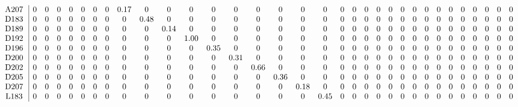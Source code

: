 \begin{table}[H]
\begin{center}
\begin{math}
\begin{array}{c|cccccccccccccccccccccccccccccccc}
\mathrm{A207} \hspace*{2pt} &  0 &  0 &  0 &  0 &  0 &  0 &  0 &       0.17 &  0 &  0 &  0 &  0 &  0 &  0 &  0 &  0 &  0 &  0 &  0 &  0 &  0 &  0 &  0 &  0 &  0 &  0 &  0 &  0 &  0 &  0 &  0 &  0 \\
\mathrm{D183} \hspace*{2pt} &  0 &  0 &  0 &  0 &  0 &  0 &  0 &  0 &       0.48 &  0 &  0 &  0 &  0 &  0 &  0 &  0 &  0 &  0 &  0 &  0 &  0 &  0 &  0 &  0 &  0 &  0 &  0 &  0 &  0 &  0 &  0 &  0 \\
\mathrm{D189} \hspace*{2pt} &  0 &  0 &  0 &  0 &  0 &  0 &  0 &  0 &  0 &       0.14 &  0 &  0 &  0 &  0 &  0 &  0 &  0 &  0 &  0 &  0 &  0 &  0 &  0 &  0 &  0 &  0 &  0 &  0 &  0 &  0 &  0 &  0 \\
\mathrm{D192} \hspace*{2pt} &  0 &  0 &  0 &  0 &  0 &  0 &  0 &  0 &  0 &  0 &       1.00 &  0 &  0 &  0 &  0 &  0 &  0 &  0 &  0 &  0 &  0 &  0 &  0 &  0 &  0 &  0 &  0 &  0 &  0 &  0 &  0 &  0 \\
\mathrm{D196} \hspace*{2pt} &  0 &  0 &  0 &  0 &  0 &  0 &  0 &  0 &  0 &  0 &  0 &       0.35 &  0 &  0 &  0 &  0 &  0 &  0 &  0 &  0 &  0 &  0 &  0 &  0 &  0 &  0 &  0 &  0 &  0 &  0 &  0 &  0 \\
\mathrm{D200} \hspace*{2pt} &  0 &  0 &  0 &  0 &  0 &  0 &  0 &  0 &  0 &  0 &  0 &  0 &       0.31 &  0 &  0 &  0 &  0 &  0 &  0 &  0 &  0 &  0 &  0 &  0 &  0 &  0 &  0 &  0 &  0 &  0 &  0 &  0 \\
\mathrm{D202} \hspace*{2pt} &  0 &  0 &  0 &  0 &  0 &  0 &  0 &  0 &  0 &  0 &  0 &  0 &  0 &       0.66 &  0 &  0 &  0 &  0 &  0 &  0 &  0 &  0 &  0 &  0 &  0 &  0 &  0 &  0 &  0 &  0 &  0 &  0 \\
\mathrm{D205} \hspace*{2pt} &  0 &  0 &  0 &  0 &  0 &  0 &  0 &  0 &  0 &  0 &  0 &  0 &  0 &  0 &       0.36 &  0 &  0 &  0 &  0 &  0 &  0 &  0 &  0 &  0 &  0 &  0 &  0 &  0 &  0 &  0 &  0 &  0 \\
\mathrm{D207} \hspace*{2pt} &  0 &  0 &  0 &  0 &  0 &  0 &  0 &  0 &  0 &  0 &  0 &  0 &  0 &  0 &  0 &       0.18 &  0 &  0 &  0 &  0 &  0 &  0 &  0 &  0 &  0 &  0 &  0 &  0 &  0 &  0 &  0 &  0 \\
\mathrm{L183} \hspace*{2pt} &  0 &  0 &  0 &  0 &  0 &  0 &  0 &  0 &  0 &  0 &  0 &  0 &  0 &  0 &  0 &  0 &       0.45 &  0 &  0 &  0 &  0 &  0 &  0 &  0 &  0 &  0 &  0 &  0 &  0 &  0 &  0 &  0 \\

\end{array}
\end{math}
\end{center}
\end{table}
